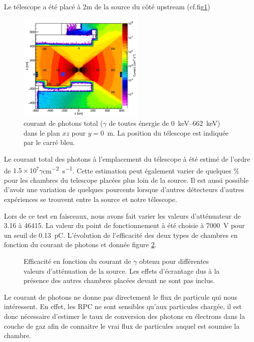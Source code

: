 Le télescope a été placé à 2m de la source du côté upstream (cf.fig\ref{PositionChambre})

\begin{figure}[!ht]
	\centering
	\includegraphics[width=0.55\textwidth]{GLA/PositionChamber.png}
	\caption{courant de photons total ($\gamma$ de toutes énergie de \SIrange{0}{662}{\kilo\eV}) dans le plan $xz$ pour $y=$\SI{0}{\meter}. La position du télescope est indiquée par le carré bleu.}
	\label{PositionChambre}
\end{figure}

Le courant total des photons à l'emplacement du télescope à été estimé de l'ordre de $1.5\times10^{7}\gamma$\si{cm^{-2}.s^{-1}}. Cette estimation peut également varier de quelques \% pour les chambres du telescope placées plus loin de la source. Il est aussi possible d'avoir une variation de quelques pourcents lorsque d'autres détecteurs d'autres expériences se trouvent entre la source et notre télescope.

Lors de ce test en faisceaux, nous avons fait varier les valeurs d'atténuateur de \num{3.16} à \num{46415}. La valeur du point de fonctionnement à été choisie à \SI{7000}{\volt} pour un seuil de \SI{0.13}{\pico\coulomb}. L'évolution de l'efficacité des deux types de chambres en fonction du courant de photons et donnée figure \ref{ATTENUATEURGIF}.

\begin{figure}[!ht]
	\centering
	\scalebox{1.2}{}
	\caption{Efficacité en fonction du courant de $\gamma$ obtenu pour différentes valeurs d'atténuation de la source. Les effets d'écrantage dus à la présence des autres chambres placées devant ne sont pas inclus.}
	\label{ATTENUATEURGIF}
\end{figure}

Le courant de photons ne donne pas directement le flux de particule qui nous intéressent. En effet, les RPC ne sont sensibles qu'aux particules chargée, il est donc nécessaire d'estimer le taux de conversion des photons en électrons dans la couche de gaz afin de connaitre le vrai flux de particules auquel est soumise la chambre. 


